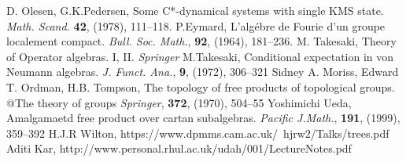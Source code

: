 \begin{thebibliography}{99}
   D. Olesen, G.K.Pedersen,
    Some C*-dynamical systems with single KMS state.
    {\it Math. Scand.}
    {\bf 42}, (1978), 111--118.
   P.Eymard,
    L'alg\'{e}bre de Fourie d'un groupe localement compact.
    {\it Bull. Soc. Math.},
    {\bf 92}, (1964), 181--236.
   M. Takesaki,
    Theory of Operator algebras. I, II.
    {\it Springer}
   M.Takesaki,
    Conditional expectation in von Neumann algebras.
    {\it J. Funct. Ana.},
    {\bf 9}, (1972), 306--321
   Sidney A. Moriss, Edward T. Ordman, H.B. Tompson,
    The topology of free products of topological groups. @The theory of groups
    {\it Springer},
    {\bf 372}, (1970), 504--55
   Yoshimichi Ueda,
    Amalgamaetd free product over cartan subalgebras.
    {\it Pacific J.Math.},
    {\bf 191}, (1999), 359--392
   H.J.R Wilton,
    https://www.dpmms.cam.ac.uk/~hjrw2/Talks/trees.pdf
   Aditi Kar,
    http://www.personal.rhul.ac.uk/udah/001/LectureNotes.pdf
\end{thebibliography}
